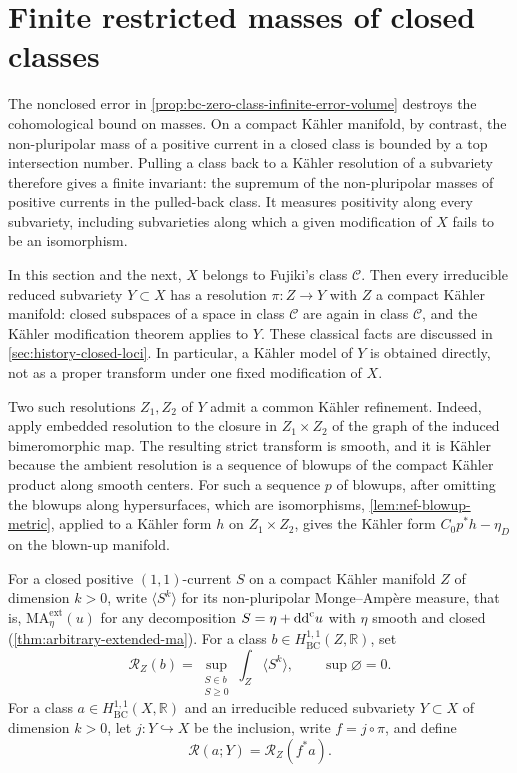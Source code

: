 \section{Finite restricted masses of closed classes}
\label{sec:finite-restricted-invariants}

The nonclosed error in \cref{prop:bc-zero-class-infinite-error-volume} destroys the cohomological bound on masses. On a compact K\"ahler manifold, by contrast, the non-pluripolar mass of a positive current in a closed class is bounded by a top intersection number. Pulling a class back to a K\"ahler resolution of a subvariety therefore gives a finite invariant: the supremum of the non-pluripolar masses of positive currents in the pulled-back class. It measures positivity along every subvariety, including subvarieties along which a given modification of $X$ fails to be an isomorphism.

In this section and the next, $X$ belongs to Fujiki's class $\mathcal C$. Then every irreducible reduced subvariety $Y\subset X$ has a resolution $\pi\colon Z\to Y$ with $Z$ a compact K\"ahler manifold: closed subspaces of a space in class $\mathcal C$ are again in class $\mathcal C$, and the K\"ahler modification theorem applies to $Y$. These classical facts are discussed in \cref{sec:history-closed-loci}. In particular, a K\"ahler model of $Y$ is obtained directly, not as a proper transform under one fixed modification of $X$.

Two such resolutions $Z_1,Z_2$ of $Y$ admit a common K\"ahler refinement. Indeed, apply embedded resolution to the closure in $Z_1\times Z_2$ of the graph of the induced bimeromorphic map. The resulting strict transform is smooth, and it is K\"ahler because the ambient resolution is a sequence of blowups of the compact K\"ahler product along smooth centers. For such a sequence $p$ of blowups, after omitting the blowups along hypersurfaces, which are isomorphisms, \cref{lem:nef-blowup-metric}, applied to a K\"ahler form $h$ on $Z_1\times Z_2$, gives the K\"ahler form $C_0p^*h-\eta_D$ on the blown-up manifold.

For a closed positive $(1,1)$-current $S$ on a compact K\"ahler manifold $Z$ of dimension $k>0$, write $\langle S^k\rangle$ for its non-pluripolar Monge--Amp\`ere measure, that is, $\mathrm{MA}^{\mathrm{ext}}_\eta(u)$ for any decomposition $S=\eta+\mathrm{dd}^{\mathrm{c}} u$ with $\eta$ smooth and closed (\cref{thm:arbitrary-extended-ma}). For a class $b\in H^{1,1}_{\mathrm{BC}}(Z,\mathbb R)$, set
\begin{equation}\label{eq:closed-class-mass}
 \mathcal R_Z(b)=\sup_{\substack{S\in b\\S\geq0}}
                  \int_Z\langle S^k\rangle,
 \qquad \sup\varnothing=0.
\end{equation}
For a class $a\in H^{1,1}_{\mathrm{BC}}(X,\mathbb R)$ and an irreducible reduced subvariety $Y\subset X$ of dimension $k>0$, let $j\colon Y\hookrightarrow X$ be the inclusion, write $f=j\circ\pi$, and define
\begin{equation}\label{eq:finite-restricted-invariant}
 \mathcal R(a;Y)=\mathcal R_Z(f^*a).
\end{equation}


